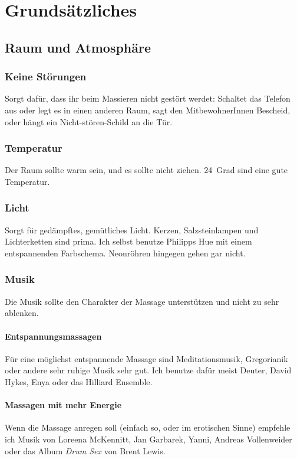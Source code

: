 \chapter{Grundsätzliches}

\section{Raum und Atmosphäre}

\subsection{Keine Störungen}

Sorgt dafür, dass ihr beim Massieren nicht gestört werdet: Schaltet das Telefon aus oder legt es in einen anderen Raum, sagt den MitbewohnerInnen Bescheid, oder hängt ein Nicht-stören-Schild an die Tür.

\subsection{Temperatur}

Der Raum sollte warm sein, und es sollte nicht ziehen. 24~Grad sind eine gute Temperatur.

\subsection{Licht}

Sorgt für gedämpftes, gemütliches Licht. Kerzen, Salzsteinlampen und Lichterketten sind prima. Ich selbst benutze Philipps Hue mit einem entspannenden Farbschema. Neonröhren hingegen gehen gar nicht.

\subsection{Musik}
Die Musik sollte den Charakter der Massage unterstützen und nicht zu sehr ablenken.

\subsubsection{Entspannungsmassagen}
Für eine möglichst entspannende Massage sind Meditationsmusik, Gregorianik oder andere sehr ruhige Musik sehr gut. Ich benutze dafür meist Deuter, David Hykes, Enya oder das Hilliard Ensemble.

\subsubsection{Massagen mit mehr Energie}
Wenn die Massage anregen soll (einfach so, oder im erotischen Sinne) empfehle ich Musik von Loreena McKennitt, Jan Garbarek, Yanni, Andreas Vollenweider oder das Album \emph{Drum Sex} von Brent Lewis.


